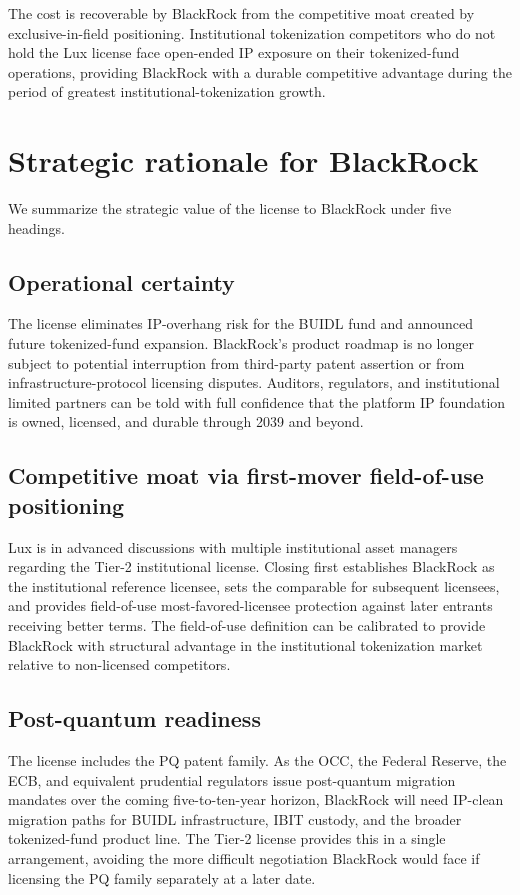 \documentclass[11pt,letterpaper]{article}
\begin{document}
The cost is recoverable by BlackRock from the competitive moat created by exclusive-in-field positioning. Institutional tokenization competitors who do not hold the Lux license face open-ended IP exposure on their tokenized-fund operations, providing BlackRock with a durable competitive advantage during the period of greatest institutional-tokenization growth.

\section{Strategic rationale for BlackRock}

We summarize the strategic value of the license to BlackRock under five headings.

\subsection{Operational certainty}

The license eliminates IP-overhang risk for the BUIDL fund and announced future tokenized-fund expansion. BlackRock's product roadmap is no longer subject to potential interruption from third-party patent assertion or from infrastructure-protocol licensing disputes. Auditors, regulators, and institutional limited partners can be told with full confidence that the platform IP foundation is owned, licensed, and durable through 2039 and beyond.

\subsection{Competitive moat via first-mover field-of-use positioning}

Lux is in advanced discussions with multiple institutional asset managers regarding the Tier-2 institutional license. Closing first establishes BlackRock as the institutional reference licensee, sets the comparable for subsequent licensees, and provides field-of-use most-favored-licensee protection against later entrants receiving better terms. The field-of-use definition can be calibrated to provide BlackRock with structural advantage in the institutional tokenization market relative to non-licensed competitors.

\subsection{Post-quantum readiness}

The license includes the PQ patent family. As the OCC, the Federal Reserve, the ECB, and equivalent prudential regulators issue post-quantum migration mandates over the coming five-to-ten-year horizon, BlackRock will need IP-clean migration paths for BUIDL infrastructure, IBIT custody, and the broader tokenized-fund product line. The Tier-2 license provides this in a single arrangement, avoiding the more difficult negotiation BlackRock would face if licensing the PQ family separately at a later date.
\end{document}
